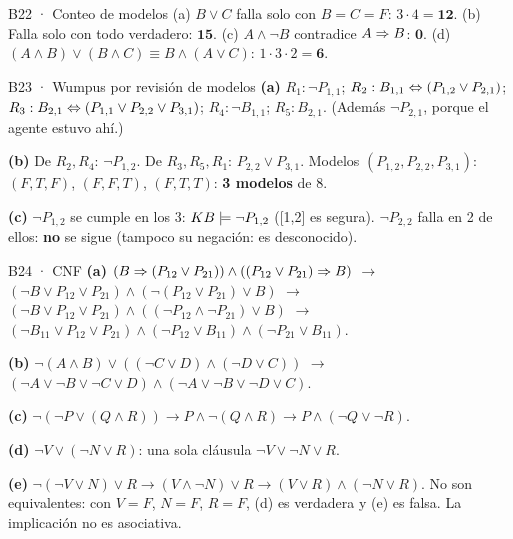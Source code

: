 \begin{solucion}{B22 · Conteo de modelos}
(a) $B\vee C$ falla solo con $B=C=F$: $3\cdot4=\mathbf{12}$. (b) Falla solo con todo verdadero: $\mathbf{15}$.
(c) $A\wedge\neg B$ contradice $A\Rightarrow B$: $\mathbf{0}$. (d) $(A\wedge B)\vee(B\wedge C)\equiv B\wedge(A\vee C)$:
$1\cdot3\cdot2=\mathbf{6}$.
\end{solucion}

\begin{solucion}{B23 · Wumpus por revisión de modelos}
\textbf{(a)} $R_1:\neg P_{1,1}$; $R_2: B_{1,1}\Leftrightarrow(P_{1,2}\vee P_{2,1})$; $R_3: B_{2,1}\Leftrightarrow(P_{1,1}\vee P_{2,2}\vee P_{3,1})$;
$R_4:\neg B_{1,1}$; $R_5: B_{2,1}$. (Además $\neg P_{2,1}$, porque el agente estuvo ahí.)

\textbf{(b)} De $R_2,R_4$: $\neg P_{1,2}$. De $R_3,R_5,R_1$: $P_{2,2}\vee P_{3,1}$. Modelos $(P_{1,2},P_{2,2},P_{3,1})$:
$(F,T,F)$, $(F,F,T)$, $(F,T,T)$: \textbf{3 modelos} de 8.

\textbf{(c)} $\neg P_{1,2}$ se cumple en los 3: $KB\models\neg P_{1,2}$ ([1,2] es segura).
$\neg P_{2,2}$ falla en 2 de ellos: \textbf{no} se sigue (tampoco su negación: es desconocido).
\end{solucion}

\begin{solucion}{B24 · CNF}
\textbf{(a)} $(B\Rightarrow(P_{12}\vee P_{21}))\wedge((P_{12}\vee P_{21})\Rightarrow B)$ $\to$
$(\neg B\vee P_{12}\vee P_{21})\wedge(\neg(P_{12}\vee P_{21})\vee B)$ $\to$
$(\neg B\vee P_{12}\vee P_{21})\wedge((\neg P_{12}\wedge\neg P_{21})\vee B)$ $\to$
$(\neg B_{11}\vee P_{12}\vee P_{21})\wedge(\neg P_{12}\vee B_{11})\wedge(\neg P_{21}\vee B_{11})$.

\textbf{(b)} $\neg(A\wedge B)\vee((\neg C\vee D)\wedge(\neg D\vee C))$ $\to$
$(\neg A\vee\neg B\vee\neg C\vee D)\wedge(\neg A\vee\neg B\vee\neg D\vee C)$.

\textbf{(c)} $\neg(\neg P\vee(Q\wedge R))\to P\wedge\neg(Q\wedge R)\to P\wedge(\neg Q\vee\neg R)$.

\textbf{(d)} $\neg V\vee(\neg N\vee R)$: una sola cláusula $\neg V\vee\neg N\vee R$.

\textbf{(e)} $\neg(\neg V\vee N)\vee R\to(V\wedge\neg N)\vee R\to(V\vee R)\wedge(\neg N\vee R)$.
No son equivalentes: con $V=F$, $N=F$, $R=F$, (d) es verdadera y (e) es falsa. La implicación no es asociativa.
\end{solucion}

